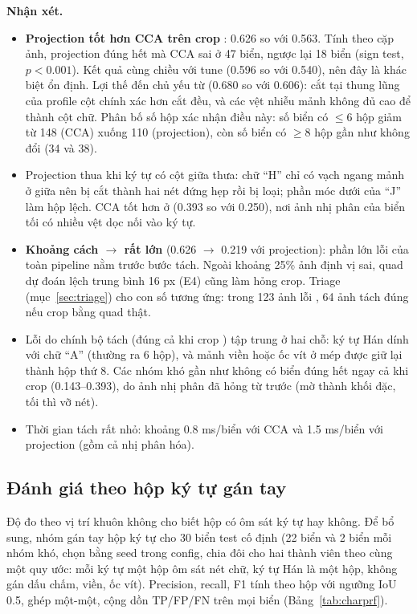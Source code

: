 \textbf{Nhận xét.}
\begin{itemize}
  \item \textbf{Projection tốt hơn CCA trên crop }: 0.626 so với 0.563. Tính theo cặp ảnh, projection đúng hết mà CCA sai ở 47 biển, ngược lại 18 biển (sign test, $p<0.001$). Kết quả cùng chiều với tune (0.596 so với 0.540), nên đây là khác biệt ổn định. Lợi thế đến chủ yếu từ  (0.680 so với 0.606): cắt tại thung lũng của profile cột chính xác hơn cắt đều, và các vệt nhiễu mảnh không đủ cao để thành cột chữ. Phân bố số hộp xác nhận điều này: số biển có $\le 6$ hộp giảm từ 148 (CCA) xuống 110 (projection), còn số biển có $\ge 8$ hộp gần như không đổi (34 và 38).
  \item Projection thua khi ký tự có cột giữa thưa: chữ ``H'' chỉ có vạch ngang mảnh ở giữa nên bị cắt thành hai nét đứng hẹp rồi bị loại; phần móc dưới của ``J'' làm hộp lệch. CCA tốt hơn ở  (0.393 so với 0.250), nơi ảnh nhị phân của biển tối có nhiều vệt dọc nối vào ký tự.
  \item \textbf{Khoảng cách  $\to$  rất lớn} (0.626 $\to$ 0.219 với projection): phần lớn lỗi của toàn pipeline nằm trước bước tách. Ngoài khoảng 25\% ảnh định vị sai, quad dự đoán lệch trung bình 16 px (E4) cũng làm hỏng crop. Triage (mục~\ref{sec:triage}) cho con số tương ứng: trong 123 ảnh lỗi , 64 ảnh tách đúng nếu crop bằng quad thật.
  \item Lỗi do chính bộ tách (đúng cả khi crop ) tập trung ở hai chỗ: ký tự Hán dính với chữ ``A'' (thường ra 6 hộp), và mảnh viền hoặc ốc vít ở mép được giữ lại thành hộp thứ 8. Các nhóm khó gần như không có biển đúng hết ngay cả khi crop  (0.143--0.393), do ảnh nhị phân đã hỏng từ trước (mờ thành khối đặc, tối thì vỡ nét).
  \item Thời gian tách rất nhỏ: khoảng 0.8 ms/biển với CCA và 1.5 ms/biển với projection (gồm cả nhị phân hóa).
\end{itemize}

\subsection{Đánh giá theo hộp ký tự gán tay}

Độ đo theo vị trí khuôn không cho biết hộp có ôm sát ký tự hay không. Để bổ sung, nhóm gán tay hộp ký tự cho 30 biển test cố định (22 biển  và 2 biển mỗi nhóm khó, chọn bằng seed trong config, chia đôi cho hai thành viên theo cùng một quy ước: mỗi ký tự một hộp ôm sát nét chữ, ký tự Hán là một hộp, không gán dấu chấm, viền, ốc vít). Precision, recall, F1 tính theo hộp với ngưỡng IoU 0.5, ghép một-một, cộng dồn TP/FP/FN trên mọi biển (Bảng~\ref{tab:charprf}).

